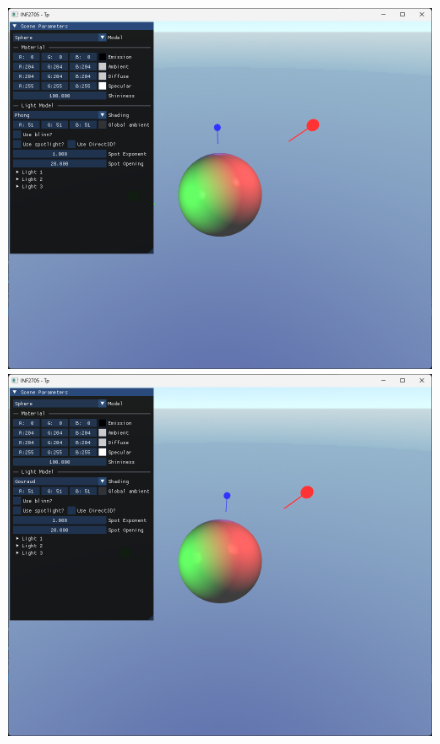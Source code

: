 \documentclass{article}[letterpaper, 11pt]
\begin{document}
\begin{figure}[h]
	\begin{minipage}[c]{.33\linewidth}
		 \centering
		 \includegraphics[scale = 0.15]{image_4.png}
	\end{minipage}
	\begin{minipage}[c]{.33\linewidth}
		 \centering
		 \includegraphics[scale = 0.15]{image_5.png}
	\end{minipage}
	\begin{minipage}[c]{.33\linewidth}

\end{minipage}
\end{figure}
\end{document}
